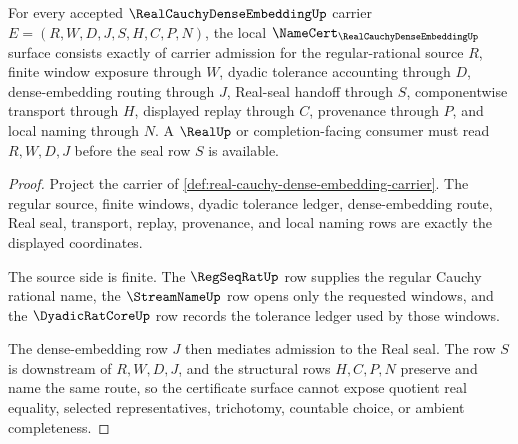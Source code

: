 \begin{theorem}
\label{thm:real-cauchy-dense-embedding-namecert-obligations}
For every accepted $\RealCauchyDenseEmbeddingUp$ carrier $E=(R,W,D,J,S,H,C,P,N)$, the local $\NameCert_{\RealCauchyDenseEmbeddingUp}$ surface consists exactly of carrier admission for the regular-rational source $R$, finite window exposure through $W$, dyadic tolerance accounting through $D$, dense-embedding routing through $J$, Real-seal handoff through $S$, componentwise transport through $H$, displayed replay through $C$, provenance through $P$, and local naming through $N$. A $\RealUp$ or completion-facing consumer must read $R,W,D,J$ before the seal row $S$ is available.
\end{theorem}
\begin{proof}
Project the carrier of \autoref{def:real-cauchy-dense-embedding-carrier}. The regular source, finite windows, dyadic tolerance ledger, dense-embedding route, Real seal, transport, replay, provenance, and local naming rows are exactly the displayed coordinates.

The source side is finite. The $\RegSeqRatUp$ row supplies the regular Cauchy rational name, the $\StreamNameUp$ row opens only the requested windows, and the $\DyadicRatCoreUp$ row records the tolerance ledger used by those windows.

The dense-embedding row $J$ then mediates admission to the Real seal. The row $S$ is downstream of $R,W,D,J$, and the structural rows $H,C,P,N$ preserve and name the same route, so the certificate surface cannot expose quotient real equality, selected representatives, trichotomy, countable choice, or ambient completeness.
\end{proof}

